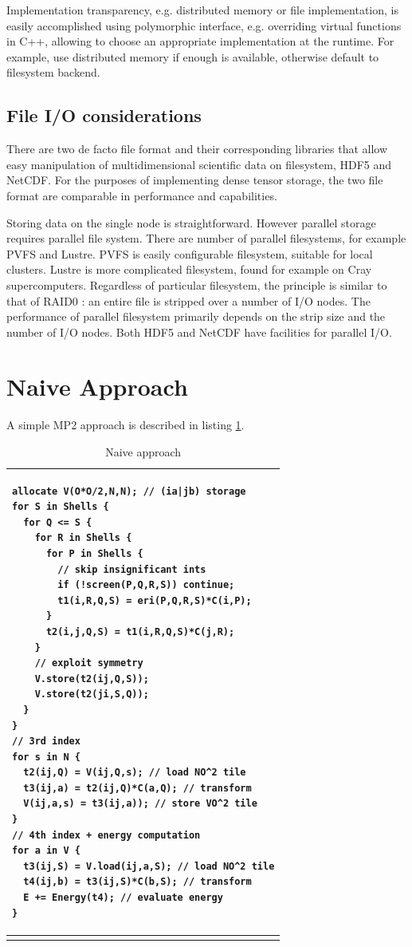\documentclass[12pt]{article} \usepackage[margin=1in]{geometry}
\newenvironment{listing}%
               {\begin{table}
                   \begin{tabular}{ p{6in} }
                     \hline}%
               {\end{tabular}%
               \end{table}}
\begin{document}
Implementation transparency, e.g. distributed memory or file
implementation, is easily accomplished using polymorphic interface,
e.g. overriding virtual functions in C++, allowing to choose an
appropriate implementation at the runtime.  For example, use 
distributed memory if enough is available, otherwise default to
filesystem backend.

\subsection{File I/O considerations}
There are two de facto file format and their corresponding libraries
that allow easy manipulation of multidimensional scientific data on
filesystem, HDF5 \cite{hdf5} and NetCDF\cite{netcdf}.
For the purposes of implementing dense
tensor storage, the two file format are comparable in performance and
capabilities.

Storing data on the single node is straightforward.
However parallel storage requires parallel file system.  There are
number of parallel filesystems, for example PVFS and Lustre.  PVFS is
easily configurable filesystem, suitable for local clusters.  Lustre
is more complicated filesystem, found for example on Cray
supercomputers.  Regardless of particular filesystem, the principle is
similar to that of RAID0 \cite{patterson1988case}: an entire file is stripped over a number of I/O
nodes.  The performance of parallel filesystem primarily depends on
the strip size and the number of I/O nodes.  Both  HDF5 and NetCDF
have facilities  for parallel I/O.

\section{Naive Approach}

A simple MP2 approach is described in listing \ref{naive}.

\begin {listing}
\begin {verbatim}
allocate V(O*O/2,N,N); // (ia|jb) storage
for S in Shells {
  for Q <= S {
    for R in Shells {
      for P in Shells {
        // skip insignificant ints
        if (!screen(P,Q,R,S)) continue;
        t1(i,R,Q,S) = eri(P,Q,R,S)*C(i,P);
      }
      t2(i,j,Q,S) = t1(i,R,Q,S)*C(j,R);
    }
    // exploit symmetry
    V.store(t2(ij,Q,S));
    V.store(t2(ji,S,Q));
  }
}
// 3rd index
for s in N {
  t2(ij,Q) = V(ij,Q,s); // load NO^2 tile
  t3(ij,a) = t2(ij,Q)*C(a,Q); // transform
  V(ij,a,s) = t3(ij,a)); // store VO^2 tile
}
// 4th index + energy computation
for a in V {
  t3(ij,S) = V.load(ij,a,S); // load NO^2 tile
  t4(ij,b) = t3(ij,S)*C(b,S); // transform
  E += Energy(t4); // evaluate energy
}
\end{verbatim} \\
\hline
\caption{Naive approach}
\label{naive}
\end{listing}
\end{document}
